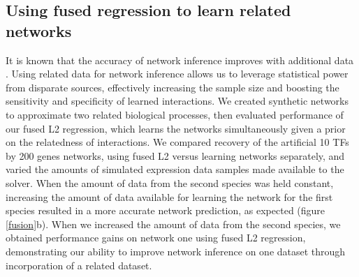 \documentclass[11pt]{article}
\begin{document}
\subsection{Using fused regression to learn related networks}
It is known that the accuracy of network inference improves with additional data \cite{bar-joseph_computational_2003}. 
Using related data for network inference allows us to leverage statistical power from disparate sources, effectively increasing the sample size and boosting the sensitivity and specificity of learned interactions. 
We created synthetic networks to approximate two related biological processes, then evaluated performance of our fused L2 regression, which learns the networks simultaneously given a prior on the relatedness of interactions. 
We compared recovery of the artificial 10 TFs by 200 genes networks, using fused L2 versus learning networks separately, and varied the amounts of simulated expression data samples made available to the solver. 
When the amount of data from the second species was held constant, increasing the amount of data available for learning the network for the first species resulted in a more accurate network prediction, as expected  (figure \ref{fusion}b). 
When we increased the amount of data from the second species, we obtained performance gains on network one using fused L2 regression, demonstrating our ability to improve network inference on one dataset through incorporation of a related dataset.
\end{document}
